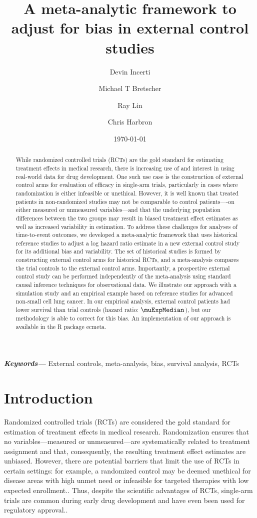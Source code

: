 \documentclass[11pt,final,fleqn]{article}\usepackage[]{graphicx}\usepackage[]{color}
\title{A meta-analytic framework to adjust for bias in external control studies}
\author[1]{Devin Incerti}
\author[2]{Michael T Bretscher}
\author[1]{Ray Lin}
\author[3]{Chris Harbron}
\affil[1]{Genentech, Inc, South San Francisco, CA, USA}
\affil[2]{F. Hoffmann-La Roche Ltd, Basel, Switzerland}
\affil[3]{Roche Products, Welwyn Garden City, UK}
\date{\today}
\newcommand{\pkg}[1]{{\fontseries{m}\fontseries{b}\selectfont #1}}
\providecommand{\keywords}[1]
{
  \small	
  \textbf{\textit{Keywords---}} #1
}
\begin{document}
\maketitle

\begin{abstract}

	While randomized controlled trials (RCTs) are the gold standard for estimating treatment effects in medical research, there is increasing use of and interest in using real-world data for drug development. One such use case is the construction of external control arms for evaluation of efficacy in single-arm trials, particularly in cases where randomization is either infeasible or unethical. However, it is well known that treated patients in non-randomized studies may not be comparable to control patients----on either measured or unmeasured variables---and that the underlying population differences between the two groups may result in biased treatment effect estimates as well as increased variability in estimation. To address these challenges for analyses of time-to-event outcomes, we developed a meta-analytic framework that uses historical reference studies to adjust a log hazard ratio estimate in a new external control study for its additional bias and variability. The set of historical studies is formed by constructing external control arms for historical RCTs, and a meta-analysis compares the trial controls to the external control arms. Importantly, a prospective external control study can be performed independently of the meta-analysis using standard causal inference techniques for observational data. We illustrate our approach with a simulation study and an empirical example based on reference studies for advanced non-small cell lung cancer. In our empirical analysis, external control patients had lower survival than trial controls (hazard ratio: $\muExpMedian$), but our methodology is able to correct for this bias. An implementation of our approach is available in the \textsf{R} package \pkg{ecmeta}. 

\end{abstract}


\keywords{External controls, meta-analysis, bias, survival analysis, RCTs}

\section{Introduction}
Randomized controlled trials (RCTs) are considered the gold standard for estimation of treatment effects in medical research. Randomization ensures that no variables---measured or unmeasured---are systematically related to treatment assignment and that, consequently, the resulting treatment effect estimates are unbiased. However, there are potential barriers that limit the use of RCTs in certain settings: for example, a randomized control may be deemed unethical for disease areas with high unmet need or infeasible for targeted therapies with low expected enrollment.\cite{black1996we, simon2015role}. Thus, despite the scientific advantages of RCTs, single-arm trials are common during early drug development \cite{sambucini2015comparison} and have even been used for regulatory approval.\cite{hatswell2016regulatory}. 
\end{document}
